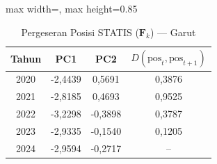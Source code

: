 \begin{table}[H]
\centering
\caption{Pergeseran Posisi STATIS ($\mathbf{F}_k$) --- Garut} \label{tab:app2jarak_statis_skor_garut}
\begin{adjustbox}{max width=\textwidth, max height=0.85\textheight}
\begin{tabular}{|c|c|c|c|}
\hline
\textbf{Tahun} & \textbf{PC1} & \textbf{PC2} & \textbf{$D(\text{pos}_t, \text{pos}_{t+1})$} \\
\hline
2020 & -2,4439 & 0,5691 & 0,3876 \\
2021 & -2,8185 & 0,4693 & 0,9525 \\
2022 & -3,2298 & -0,3898 & 0,3787 \\
2023 & -2,9335 & -0,1540 & 0,1205 \\
2024 & -2,9594 & -0,2717 & -- \\
\hline
\end{tabular}
\end{adjustbox}
\end{table}